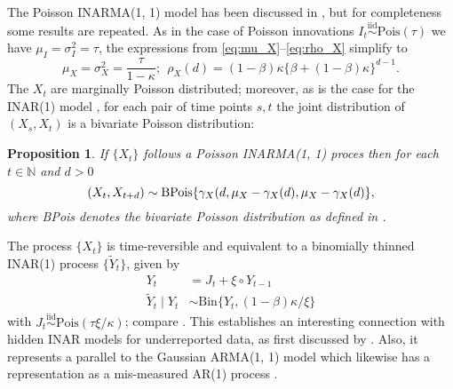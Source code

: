 \documentclass{article}
\newtheorem{proposition}{Proposition}
\begin{document}
The Poisson INARMA(1, 1) model has been discussed in \cite{Bracher2019}, but for completeness some results are repeated. As in the case of Poisson innovations $I_t \stackrel{\text{iid}}{\sim} \text{Pois}(\tau)$ we have $\mu_I = \sigma^2_I = \tau$, the expressions from \eqref{eq:mu_X}--\eqref{eq:rho_X} simplify to 
\begin{equation}
\mu_X = \sigma^2_X = \frac{\tau}{1 - \kappa}; \ \ \rho_X(d) = (1 - \beta)\kappa\{\beta + (1 - \beta)\kappa\}^{d - 1}.\label{eq:moments_poisson_11}
\end{equation}
The $X_t$ are marginally Poisson distributed; moreover, as is the case for the INAR(1) model \cite{Weiss2018a}, for each pair of time points $s, t$ the joint distribution of $(X_s, X_t)$ is a bivariate Poisson distribution:
\begin{proposition}
If $\{X_t\}$ follows a Poisson INARMA(1, 1) proces then for each $t \in \mathbb{N}$ and $d >0$
\begin{equation}
(X_t, X_{t + d}) \sim \textnormal{BPois}\{\gamma_X(d, \mu_X - \gamma_X(d), \mu_X - \gamma_X(d)\},\label{eq:bivariate_poisson}
\end{equation}
where BPois denotes the bivariate Poisson distribution as defined in \cite{Johnson1997}.
\end{proposition}
The process $\{X_t\}$ is time-reversible and equivalent to a binomially thinned INAR(1) process $\{\tilde{Y}_t\}$, given by
\begin{align}
Y_t & = J_t + \xi \circ Y_{t - 1} \label{eq:equiv_INAR1_Y}\\
\tilde{Y}_t \mid Y_t & \sim \text{Bin}\{Y_t, (1 - \beta)\kappa/\xi\}\label{eq:equiv_INAR1_Ytilde}
\end{align}
with $J_t \stackrel{\text{iid}}{\sim} \text{Pois}(\tau\xi/\kappa)$; compare \citep{Bracher2019}. This establishes an interesting connection with hidden INAR models for underreported data, as first discussed by \cite{Fernandez-Fontelo2016}. Also, it represents a parallel to the Gaussian ARMA(1, 1) model which likewise has a representation as a mis-measured AR(1) process \citep[Lemma 1]{Staudenmayer2005}. %
\end{document}
